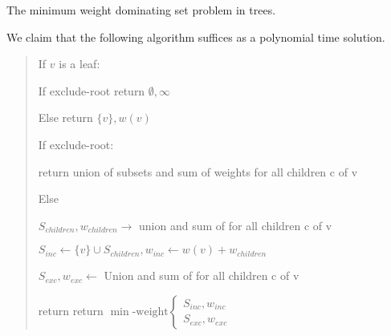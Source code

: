 \documentclass{article}
\begin{document}
\begin{subexercise}
  The minimum weight dominating set problem in trees.
\end{subexercise}

\begin{solution} We claim that the following algorithm suffices as a polynomial time solution.

\begin{quote}%

\begin{steps}
    \item If $v$ is a leaf:
    \begin{steps}
        \item If exclude-root return $\emptyset, \infty$
        \item Else return $\{v\}, w(v)$
    \end{steps}

    \item If exclude-root:
    \begin{steps}
         \item return union of subsets and sum of weights  for all children c of v
     \end{steps}
    \item Else
    \begin{steps}
        \item $S_{children}, w_{children} \rightarrow$ union and sum of  for all children c of v
        \item $S_{inc}\leftarrow \{v\} \cup S_{children} ,w_{inc} \leftarrow w(v) + w_{children}$
        \item $S_{exc}, w_{exc} \leftarrow$ Union and sum of  for all children c of v
        \item return return $ \min\text{-weight} \begin{cases}
           S_{inc},w_{inc}\\
           S_{exc}, w_{exc}
        \end{cases}$
    \end{steps}


\end{steps}
\end{quote}
\end{solution}
\end{document}
